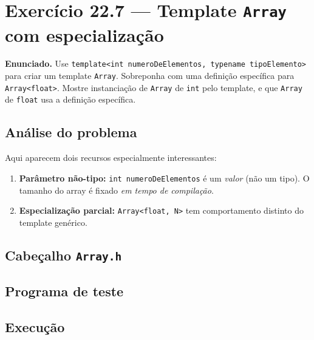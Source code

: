 \documentclass[11pt,a4paper]{article}
\begin{document}
\newpage
\section{Exerc\'icio 22.7 --- Template \texttt{Array} com especializa\c{c}\~ao}

\begin{enunciado}
\textbf{Enunciado.} Use \texttt{template<int numeroDeElementos, typename tipoElemento>} para criar um template \texttt{Array}. Sobreponha com uma defini\c{c}\~ao espec\'ifica para \texttt{Array<float>}. Mostre instancia\c{c}\~ao de \texttt{Array} de \texttt{int} pelo template, e que \texttt{Array} de \texttt{float} usa a defini\c{c}\~ao espec\'ifica.
\end{enunciado}

\subsection*{An\'alise do problema}

Aqui aparecem dois recursos especialmente interessantes:

\begin{enumerate}[leftmargin=*,itemsep=0pt]
  \item \textbf{Par\^ametro n\~ao-tipo:} \texttt{int numeroDeElementos} \'e um \emph{valor} (n\~ao um tipo). O tamanho do array \'e fixado \emph{em tempo de compila\c{c}\~ao}.
  \item \textbf{Especializa\c{c}\~ao parcial:} \texttt{Array<float, N>} tem comportamento distinto do template gen\'erico.
\end{enumerate}

\subsection*{Cabe\c{c}alho \texttt{Array.h}}



\subsection*{Programa de teste}



\subsection*{Execu\c{c}\~ao}
\end{document}
